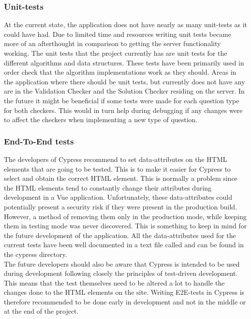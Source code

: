 \subsubsection{Unit-tests}
At the current state, the application does not have nearly as many unit-tests as it could have had. Due to limited time and resources writing unit tests became more of an afterthought in comparison to getting the server functionality working. The unit tests that the project currently has are unit tests for the different algorithms and data structures. These tests have been primarily used in order check that the algorithm implementations work as they should. Areas in the application where there should be unit tests, but currently does not have any are in the Validation Checker and the Solution Checker residing on the server. In the future it might be beneficial if some tests were made for each question type for both checkers. This would in turn help during debugging if any changes were to affect the checkers when implementing a new type of question.
\subsubsection{End-To-End tests}
The developers of Cypress recommend to set data-attributes on the HTML elements that are going to be tested. This is to make it easier for Cypress to select and obtain the correct HTML element. This is normally a problem since the HTML elements tend to constantly change their attributes during development in a Vue application. Unfortunately, these data-attributes could potentially present a security risk if they were present in the production build. However, a method of removing them only in the production mode, while keeping them in testing mode was never discovered. This is something to keep in mind for the future development of the application. All the data-attributes used for the current tests have been well documented in a text file called  and can be found in the cypress directory.\cite{Cypress:BestPractise}
\\[11pt] 
The future developers should also be aware that Cypress is intended to be used during development following closely the principles of test-driven development. This means that the test themselves need to be altered a lot to handle the changes done to the HTML elements on the site. Writing E2E-tests in Cypress is therefore recommended to be done early in development and not in the middle or at the end of the project.

